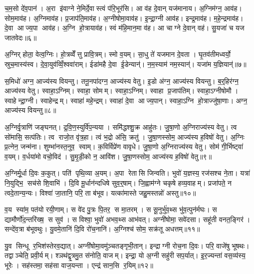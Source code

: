च॒म॒सो दे॑व॒पान॑। अ॒रा इ॑वाग्ने ने॒मिर्दे॒वास्त्वं प॑रि॒भूर॑सि। आ व॑ह दे॒वान् यज॑मानाय। अ॒ग्निम॑ग्न॒ आव॑ह। सोम॒माव॑ह। अ॒ग्निमाव॑ह। प्र॒जाप॑ति॒माव॑ह। अ॒ग्नीषोमा॒वाव॑ह। इ॒न्द्रा॒ग्नी आव॑ह। इन्द्र॒माव॑ह। म॒हे॒न्द्रमाव॑ह। दे॒वा आज्य॒पा आव॑ह। अ॒ग्नि हो॒त्रायाव॑ह। स्वं म॑हि॒मान॒मा व॑ह। आ चाग्ने दे॒वान् वह॑। सु॒यजा॑ च यज जातवेदः॥६॥\anuvakamend[दे॒वाना॒मिन्द्र॒मा व॑ह॒ षट् च॑]

अ॒ग्निर् होता॒ वेत्व॒ग्निः। हो॒त्रव्वेँत्तु प्रावि॒त्रम्। स्मो व॒यम्। सा॒धु ते॑ यजमान दे॒वता। घृ॒तव॑तीमध्वर्यो॒ स्रुच॒मास्य॑स्व। दे॒वा॒युव॑व्विँ॒श्ववा॑राम्। ईडा॑महै दे॒वा ई॒डेन्यान्॑। न॒म॒स्याम॑ नम॒स्यान्॑। यजा॑म य॒ज्ञियान्॑॥७॥\anuvakamend[अ॒ग्निर्‌होता॒ नव॑]

स॒मिधो॑ अग्न॒ आज्य॑स्य वियन्तु। तनू॒नपा॑दग्न॒ आज्य॑स्य वेतु। इ॒डो अ॑ग्न॒ आज्य॑स्य वियन्तु। ब॒र्॒हिर॑ग्न॒ आज्य॑स्य वेतु। स्वाहा॒ऽग्निम्। स्वाहा॒ सोमम्। स्वाहा॒ऽग्निम्। स्वाहा प्र॒जाप॑तिम्। स्वाहा॒ऽग्नीषोमौ। स्वाहेन्द्रा॒ग्नी। स्वाहेन्द्रम्। स्वाहा॑ महे॒न्द्रम्। स्वाहा॑ दे॒वा आज्य॒पान्। स्वाहा॒ऽग्नि हो॒त्राज्जु॑षा॒णाः। अग्न॒ आज्य॑स्य वियन्तु॥८॥\anuvakamend[इ॒न्द्रा॒ग्नी पञ्च॑ च]

अ॒ग्निर्वृ॒त्राणि॑ जङ्घनत्। द्र॒वि॒ण॒स्युर्वि॑प॒न्यया। समि॑द्धश्शु॒क्र आहु॑तः। जु॒षा॒णो अ॒ग्निराज्य॑स्य वेतु। त्व सो॑मासि॒ सत्प॑तिः। त्व राजो॒त वृ॑त्र॒हा। त्वं भ॒द्रो अ॑सि॒ क्रतु॑। जु॒षा॒णस्सोम॒ आज्य॑स्य ह॒विषो॑ वेतु। अ॒ग्निः प्र॒त्नेन॒ जन्म॑ना। शुम्भा॑नस्त॒नुव॒ स्वाम्। क॒विर्विप्रे॑ण वावृधे। जु॒षा॒णो अ॒ग्निराज्य॑स्य वेतु। सोम॑ गी॒र्भिष्ट्वा॑ व॒यम्। व॒र्धया॑मो वचो॒विद॑। सु॒मृ॒डी॒को न॒ आवि॑श। जु॒षा॒णस्सोम॒ आज्य॑स्य ह॒विषो॑ वेतु॥९॥\anuvakamend[स्वा षट् च॑]

अ॒ग्निर्मू॒र्धा दि॒वः क॒कुत्। पति॑ पृथि॒व्या अ॒यम्। अ॒पा रेतासि जिन्वति। भुवो॑ य॒ज्ञस्य॒ रज॑सश्च ने॒ता। यत्रा॑ नि॒युद्भि॒ सच॑से शि॒वाभि॑। दि॒वि मू॒र्धान॑न्दधिषे सुव॒र्॒षाम्। जि॒ह्वाम॑ग्ने चकृषे हव्य॒वाहम्। प्रजा॑पते॒ न त्वदे॒तान्य॒न्यः। विश्वा॑ जा॒तानि॒ परि॒ ता ब॑भूव। यत्का॑मास्ते जहु॒मस्तन्नो॑ अस्तु॥१०॥

व॒य स्या॑म॒ पत॑यो रयी॒णाम्। स वे॑द पु॒त्रः पि॒तर॒ स मा॒तरम्। स सू॒नुर्भु॑व॒थ्स भु॑व॒त्पुन॑र्मघः। स द्यामौर्णो॑द॒न्तरि॑ख्ष॒ स सुव॑। स विश्वा॒ भुवो॑ अभव॒थ्स आभ॑वत्। अग्नी॑षोमा॒ सवे॑दसा। सहू॑ती वनत॒ङ्गिर॑। सन्दे॑व॒त्रा ब॑भूवथुः। यु॒वमे॒तानि॑ दि॒वि रो॑च॒नानि॑। अ॒ग्निश्च॑ सोम॒ सक्र॑तू अधत्तम्॥११॥

यु॒व सिन्धू र॒भिश॑स्तेरव॒द्यात्। अग्नी॑षोमा॒वमु॑ञ्चतङ्गृभी॒तान्। इन्द्राग्नी रोच॒ना दि॒वः। परि॒ वाजे॑षु भूषथः। तद्वाञ्चेति॒ प्रवी॒र्यम्। श्ञथ॑द्वृ॒त्रमु॒त स॑नोति॒ वाजम्। इन्द्रा॒ यो अ॒ग्नी सहु॑री सप॒र्यात्। इ॒र॒ज्यन्ता॑ वस॒व्य॑स्य॒ भूरेः। सह॑स्तमा॒ सह॑सा वाज॒यन्ता। एन्द्र॑ सान॒सि र॒यिम्॥१२॥

